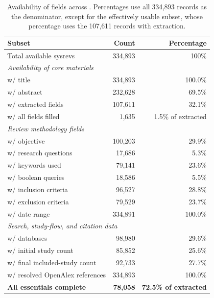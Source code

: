 \begin{table}[t]
\centering
\sffamily
\renewcommand{\arraystretch}{1}
\caption{Availability of fields across \webisSRCorpus. Percentages use all 334,893 records as the denominator, except for the effectively usable subset, whose percentage uses the 107,611 records with extraction.}

\begin{tabular*}{\columnwidth}{@{\extracolsep{\fill}}lrr}
\toprule
\textbf{Subset} & \textbf{Count} & \textbf{Percentage} \\
\midrule
Total available sysrevs & 334,893 & 100\% \\
\midrule
\multicolumn{3}{l}{\textit{Availability of core materials}} \\
w/ title & 334,893 & 100.0\% \\
w/ abstract & 232,628 & 69.5\% \\
w/ extracted fields & 107,611 & 32.1\% \\
w/ all fields filled & 1,635 & 1.5\% of extracted \\
\midrule
\multicolumn{3}{l}{\textit{Review methodology fields}} \\
w/ objective & 100,203 & 29.9\% \\
w/ research questions & 17,686 & 5.3\% \\
w/ keywords used & 79,141 & 23.6\% \\
w/ boolean queries & 18,586 & 5.5\% \\
w/ inclusion criteria & 96,527 & 28.8\% \\
w/ exclusion criteria & 79,529 & 23.7\% \\
w/ date range & 334,891 & 100.0\% \\
\midrule
\multicolumn{3}{l}{\textit{Search, study-flow, and citation data}} \\
w/ databases & 98,980 & 29.6\% \\
w/ initial study count & 85,852 & 25.6\% \\
w/ final included-study count & 92,733 & 27.7\% \\
w/ resolved OpenAlex references & 334,893 & 100.0\% \\
\midrule
\textbf{All essentials complete} & \textbf{78,058} & \textbf{72.5\% of extracted} \\
\bottomrule
\end{tabular*}
\label{tab:sysrev_field_coverage}
\end{table}
